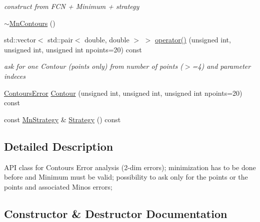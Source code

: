 \begin{DoxyCompactItemize}
\begin{DoxyCompactList}\small\item\em construct from F\+CN + Minimum + strategy \end{DoxyCompactList}\item 
\mbox{\hyperlink{classROOT_1_1Minuit2_1_1MnContours_a0764759095adb2129ae9282024af472a}{$\sim$\+Mn\+Contours}} ()
\item 
std\+::vector$<$ std\+::pair$<$ double, double $>$ $>$ \mbox{\hyperlink{classROOT_1_1Minuit2_1_1MnContours_a8d3577d628e22ad0513ed1eb71f8619b}{operator()}} (unsigned int, unsigned int, unsigned int npoints=20) const
\begin{DoxyCompactList}\small\item\em ask for one Contour (points only) from number of points ($>$=4) and parameter indeces \end{DoxyCompactList}\item 
\mbox{\hyperlink{classROOT_1_1Minuit2_1_1ContoursError}{Contours\+Error}} \mbox{\hyperlink{classROOT_1_1Minuit2_1_1MnContours_a8bcd5be6a72acc39c1b56fd45e9958ba}{Contour}} (unsigned int, unsigned int, unsigned int npoints=20) const
\item 
const \mbox{\hyperlink{classROOT_1_1Minuit2_1_1MnStrategy}{Mn\+Strategy}} \& \mbox{\hyperlink{classROOT_1_1Minuit2_1_1MnContours_a79b55e1c06425b314701c4a3e5b7b009}{Strategy}} () const
\end{DoxyCompactItemize}


\subsection{Detailed Description}
A\+PI class for Contours Error analysis (2-\/dim errors); minimization has to be done before and Minimum must be valid; possibility to ask only for the points or the points and associated Minos errors; 

\subsection{Constructor \& Destructor Documentation}
\mbox{\label{classROOT_1_1Minuit2_1_1MnContours_a87d983509ac3ce6f6635407a81e07153}} 

